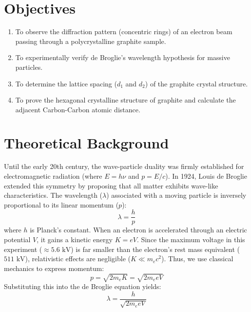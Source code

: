 \documentclass[a4paper,11pt]{article}
\begin{document}
\section{Objectives}
\begin{enumerate}
    \item To observe the diffraction pattern (concentric rings) of an electron beam passing through a polycrystalline graphite sample.
    \item To experimentally verify de Broglie's wavelength hypothesis for massive particles.
    \item To determine the lattice spacing ($d_1$ and $d_2$) of the graphite crystal structure.
    \item To prove the hexagonal crystalline structure of graphite and calculate the adjacent Carbon-Carbon atomic distance.
\end{enumerate}

\section{Theoretical Background}
Until the early 20th century, the wave-particle duality was firmly established for electromagnetic radiation (where $E = h\nu$ and $p = E/c$). In 1924, Louis de Broglie extended this symmetry by proposing that all matter exhibits wave-like characteristics. The wavelength ($\lambda$) associated with a moving particle is inversely proportional to its linear momentum ($p$):
\begin{equation}
    \lambda = \frac{h}{p}
\end{equation}
where $h$ is Planck's constant. When an electron is accelerated through an electric potential $V$, it gains a kinetic energy $K = eV$. Since the maximum voltage in this experiment ($\approx 5.6\text{ kV}$) is far smaller than the electron's rest mass equivalent ($511\text{ kV}$), relativistic effects are negligible ($K \ll m_e c^2$). Thus, we use classical mechanics to express momentum:
\begin{equation}
    p = \sqrt{2 m_e K} = \sqrt{2 m_e e V}
\end{equation}
Substituting this into the de Broglie equation yields:
\begin{equation} \label{eq:debroglie_v}
    \lambda = \frac{h}{\sqrt{2 m_e e V}}
\end{equation}
\end{document}
